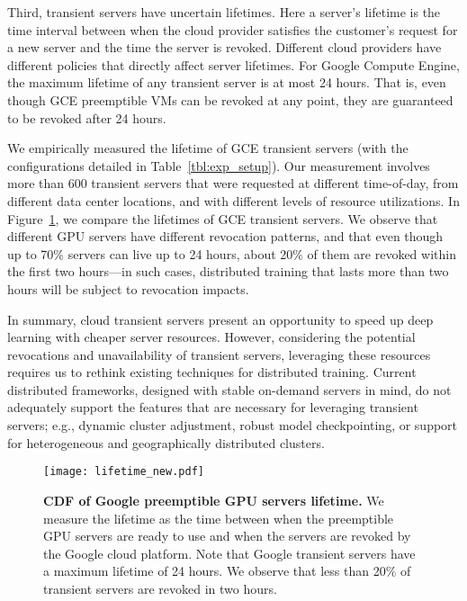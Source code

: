 Third, transient servers have uncertain lifetimes. Here a server's lifetime is
the time interval  between when the cloud provider satisfies the customer's
request for a new server and the time the server is revoked. Different cloud
providers have different policies that directly affect server lifetimes. For
Google Compute Engine, the maximum lifetime of any transient server is at  most
24 hours. That is, even though GCE preemptible VMs can be revoked at any point, 
they are guaranteed to be revoked after 24 hours. 

We empirically measured the lifetime of GCE transient servers (with the
configurations detailed in Table~\ref{tbl:exp_setup}). Our measurement involves 
more than 600 transient servers that were requested at different time-of-day, from 
different data center locations, and with different levels of resource utilizations. 
In Figure~\ref{design:gpu_lifetime}, we compare the lifetimes of GCE transient 
servers. We observe that different GPU servers have different revocation patterns, and that 
even though up to 70\% servers can live up to 24 hours, about 20\% of them are revoked 
within the first two hours---in such cases, distributed training that lasts more than two hours 
will be subject to revocation impacts. 


In summary, cloud transient servers present an opportunity to speed up deep
learning with cheaper server resources.  However, considering the potential
revocations and unavailability of transient servers, leveraging these resources
requires us to rethink existing techniques for distributed training.  Current
distributed frameworks, designed with stable on-demand servers in mind, do not
adequately support the features that are necessary for leveraging transient
servers; e.g., dynamic cluster adjustment, robust model checkpointing, 
or support for heterogeneous and geographically distributed clusters. 


    
 \begin{figure}[t]
\centering
    \texttt{[image: lifetime\_new.pdf]}
\caption{\textbf{CDF of Google preemptible GPU servers lifetime.} We measure
   the lifetime as the time between when the preemptible GPU servers are ready
   to use and when the  servers are revoked by the Google cloud
   platform. Note that Google transient servers have a maximum lifetime of 24
   hours. We observe that less than 20\% of transient servers are revoked in two hours.}
    \label{design:gpu_lifetime}
\end{figure}
